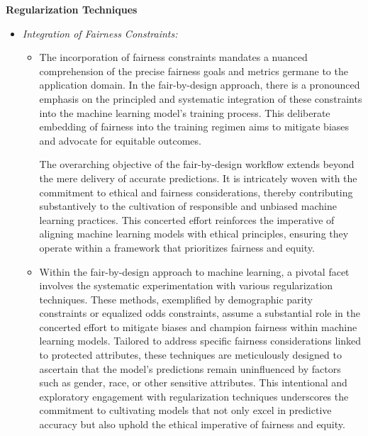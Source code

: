 \textbf{Regularization Techniques}

\begin{itemize}

    \item \emph{Integration of Fairness Constraints:}

    \begin{itemize}

        \item The incorporation of fairness constraints mandates a nuanced comprehension of the precise fairness goals and metrics germane to the application domain. In the fair-by-design approach, there is a pronounced emphasis on the principled and systematic integration of these constraints into the machine learning model's training process. This deliberate embedding of fairness into the training regimen aims to mitigate biases and advocate for equitable outcomes.

        The overarching objective of the fair-by-design workflow extends beyond the mere delivery of accurate predictions. It is intricately woven with the commitment to ethical and fairness considerations, thereby contributing substantively to the cultivation of responsible and unbiased machine learning practices. This concerted effort reinforces the imperative of aligning machine learning models with ethical principles, ensuring they operate within a framework that prioritizes fairness and equity.

        \item Within the fair-by-design approach to machine learning, a pivotal facet involves the systematic experimentation with various regularization techniques. These methods, exemplified by demographic parity constraints or equalized odds constraints, assume a substantial role in the concerted effort to mitigate biases and champion fairness within machine learning models. Tailored to address specific fairness considerations linked to protected attributes, these techniques are meticulously designed to ascertain that the model's predictions remain uninfluenced by factors such as gender, race, or other sensitive attributes. This intentional and exploratory engagement with regularization techniques underscores the commitment to cultivating models that not only excel in predictive accuracy but also uphold the ethical imperative of fairness and equity.
    
    \end{itemize}

\end{itemize}

